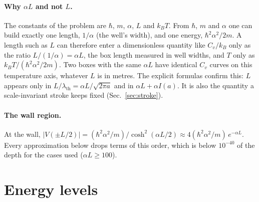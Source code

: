 \documentclass[11pt]{article}
\numberwithin{equation}{section}
\newcommand{\lth}{\lambda_{\mathrm{th}}}
\newcommand{\kB}{k_{B}}
\newcommand{\Eu}{\hbar^2\alpha^2/2m}
\begin{document}
\paragraph{Why $\alpha L$ and not $L$.} The constants of the problem are $\hbar$, $m$, $\alpha$, $L$ and $\kB T$. From $\hbar$, $m$ and $\alpha$ one can build exactly one length, $1/\alpha$ (the well's width), and one energy, $\Eu$. A length such as $L$ can therefore enter a dimensionless quantity like $C_v/\kB$ only as the ratio $L/(1/\alpha)=\alpha L$, the box length measured in well widths, and $T$ only as $\kB T/(\Eu)$. Two boxes with the same $\alpha L$ have identical $C_v$ curves on this temperature axis, whatever $L$ is in metres. The explicit formulas confirm this: $L$ appears only in $L/\lth=\alpha L/\sqrt{2\pi a}$ and in $\alpha L+\alpha I(a)$. It is also the quantity a scale-invariant stroke keeps fixed (Sec.~\ref{sec:stroke}).

\paragraph{The wall region.} At the wall, $|V(\pm L/2)|=(\hbar^2\alpha^2/m)/\cosh^2(\alpha L/2)\approx4(\hbar^2\alpha^2/m)\,e^{-\alpha L}$. Every approximation below drops terms of this order, which is below $10^{-40}$ of the depth for the cases used ($\alpha L\ge100$).

\section{Energy levels}
\label{sec:levels}
\end{document}
